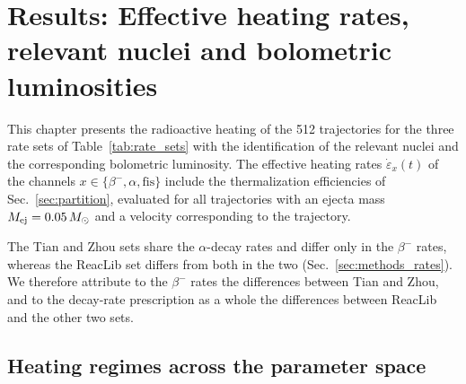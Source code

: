 \newcommand{\TODO}[1]{\textbf{[TODO: #1]}}
\chapter{Results: Effective heating rates, relevant nuclei and bolometric luminosities}\label{Results}

This chapter presents the radioactive heating of the 512 trajectories for the three rate sets of Table~\ref{tab:rate_sets} with the identification of the relevant nuclei and the corresponding bolometric luminosity.
The effective heating rates $\dot\varepsilon_x(t)$ of the channels $x\in\{\beta^-,\alpha,\mathrm{fis}\}$ include the thermalization efficiencies of Sec.~\ref{sec:partition}, evaluated for all trajectories with an ejecta mass $M_{\rm ej}=0.05\,M_\odot$ and a velocity corresponding to the trajectory.

The Tian and Zhou sets share the $\alpha$-decay rates and differ only in the $\beta^-$ rates, whereas the ReacLib set differs from both in the two (Sec.~\ref{sec:methods_rates}).
We therefore attribute to the $\beta^-$ rates the differences between Tian and Zhou, and to the decay-rate prescription as a whole the differences between ReacLib and the other two sets.

\section{Heating regimes across the parameter space}\label{sec:res_classes}


